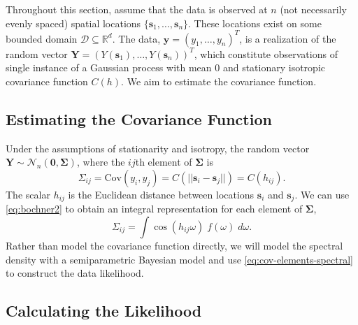 \documentclass[12pt]{article}
\begin{document}
Throughout this section, assume that the data is observed at $n$ (not necessarily evenly spaced) spatial locations $\{\bm{s}_1, \dots, \bm{s}_n\}$. These locations exist on some bounded domain $\mathcal{D} \subseteq  \mathbb{R}^d$. The data, $\bm{y} =(y_1, \dots, y_n)^T$, is a realization of the random vector $\bm{Y} = (Y(\bm{s}_1), \dots, Y(\bm{s}_n))^T$, which constitute observations of single instance of a Gaussian process with mean 0 and stationary isotropic covariance function $C(h)$. %
We aim to estimate the covariance function.

\subsection{Estimating the Covariance Function} %
\label{sec:estimating_the_covariance_function}

Under the assumptions of stationarity and isotropy, the random vector $\bm{Y} \sim \mathcal{N}_n(\bm{0}, \bm{\Sigma})$, where the $ij$th element of $\bm{\Sigma}$ is
\[
  \Sigma_{ij} = \textrm{Cov}(y_i, y_j) = C(||\bm{s}_i - \bm{s}_j||) = C(h_{ij}).
\]
The scalar $h_{ij}$ is the Euclidean distance between locations $\bm{s}_i$ and $\bm{s}_j$. We can use \eqref{eq:bochner2} to obtain an integral representation for each element of $\bm{\Sigma}$,
\begin{equation} \label{eq:cov-elements-spectral}
  \Sigma_{ij} = \int \cos(h_{ij}\omega) \; f(\omega) \; d\omega.
\end{equation}
Rather than model the covariance function directly, we will model the spectral density with a semiparametric Bayesian model and use \eqref{eq:cov-elements-spectral} to construct the data likelihood.




\subsection{Calculating the Likelihood} %
\label{sec:calculating_the_likelihood}
\end{document}
